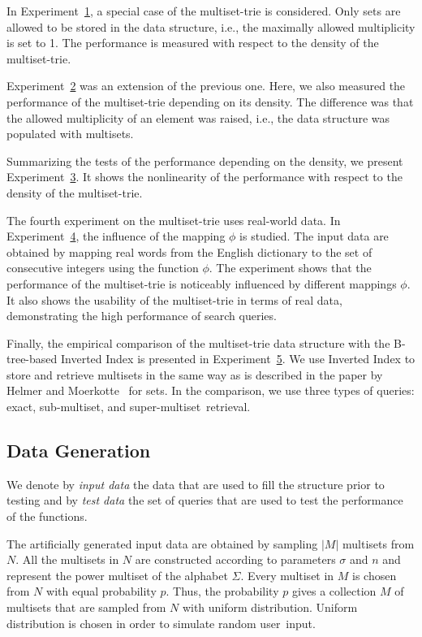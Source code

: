 \documentclass[algorithms,article,accept,pdftex,moreauthors]{Definitions/mdpi}
\begin{document}
In Experiment~\hyperref[s:exp1]{1}, a special case of the multiset-trie is considered. 
Only sets are allowed to be stored in the data structure, i.e., the maximally allowed 
multiplicity is set to 1. The performance is measured with respect to the density 
of the multiset-trie.

Experiment~\hyperref[s:exp2]{2} was an extension of the previous one. Here, 
we also measured the performance of the multiset-trie depending on its density. 
The difference was that the allowed multiplicity of an element was raised, i.e., 
the data structure was populated with multisets. 

Summarizing the tests of the performance depending on the density, we present 
Experiment~\hyperref[s:exp3]{3}. It shows the nonlinearity of the performance 
with respect to the density of the multiset-trie.

The fourth experiment on the multiset-trie uses real-world data. In 
Experiment~\hyperref[s:exp4]{4}, the influence of the mapping $\phi$ is studied. 
The input data are obtained by mapping real words from the English dictionary 
to the set of consecutive integers using the function $\phi.$ The experiment 
shows that the performance of the multiset-trie is noticeably influenced by 
different mappings $\phi.$ It also shows the usability of the multiset-trie in terms 
of real data, demonstrating the high performance of search queries.

Finally, the empirical comparison of the multiset-trie data structure with
the B-tree-based Inverted Index is presented in Experiment~\hyperref[s:exp5]{5}. We use
Inverted Index to store and retrieve multisets in the same way as
is described in the paper by Helmer and Moerkotte~\cite{Helmer2003}
for sets. In the comparison, we use three types of queries: exact,
sub-multiset, and super-multiset~retrieval.

\subsection{Data %
 Generation}
We denote by \emph{input data} the data that are used to fill the structure prior 
to testing and by \emph{test data} the set of queries that are used to test the 
performance of the functions.

The artificially generated input data are obtained by sampling $|M|$ multisets 
from $N.$ All the multisets in $N$ are constructed according to parameters 
$\sigma$ and $n$ and represent the power multiset of the alphabet $\Sigma.$ 
Every multiset in $M$ is chosen from $N$ with equal probability $p.$ Thus, the 
probability $p$ gives a collection $M$ of multisets that are sampled from $N$ 
with uniform distribution. Uniform distribution is chosen in order to simulate
random user~input.
\end{document}
